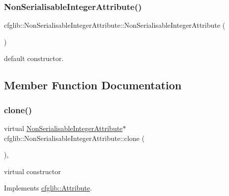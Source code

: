 \subsubsection{\texorpdfstring{Non\+Serialisable\+Integer\+Attribute()}{NonSerialisableIntegerAttribute()}\hspace{0.1cm}{\footnotesize\ttfamily [2/2]}}
{\footnotesize\ttfamily cfglib\+::\+Non\+Serialisable\+Integer\+Attribute\+::\+Non\+Serialisable\+Integer\+Attribute (\begin{DoxyParamCaption}{ }\end{DoxyParamCaption})\hspace{0.3cm}{\ttfamily [inline]}}

default constructor. 

\subsection{Member Function Documentation}
\mbox{\label{classcfglib_1_1NonSerialisableIntegerAttribute_ab37d2f2a349d73177e6fdbd1356566ab}} 
\subsubsection{\texorpdfstring{clone()}{clone()}}
{\footnotesize\ttfamily virtual \hyperlink{classcfglib_1_1NonSerialisableIntegerAttribute}{Non\+Serialisable\+Integer\+Attribute}$\ast$ cfglib\+::\+Non\+Serialisable\+Integer\+Attribute\+::clone (\begin{DoxyParamCaption}{ }\end{DoxyParamCaption})\hspace{0.3cm}{\ttfamily [inline]}, {\ttfamily [virtual]}}

virtual constructor 

Implements \hyperlink{classcfglib_1_1Attribute_a107366042fdafe881215426059fec3f8}{cfglib\+::\+Attribute}.

\mbox{\label{classcfglib_1_1NonSerialisableIntegerAttribute_aeb200350a5746f7fe535ca4db1642e9d}} 
